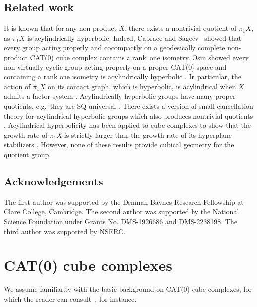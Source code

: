 \documentclass[12pt,oneside]{amsart}
\theoremstyle{definition}
\theoremstyle{definition}
\theoremstyle{remark}
\begin{document}
\subsection*{Related work}
It is known that for any non-product $X$, there exists a nontrivial quotient of $\pi_1 X$, as $\pi_1 X$ is acylindrically hyperbolic. Indeed,
Caprace and Sageev~\cite{CapraceSageev2011} showed that every group acting properly and cocompactly on a geodesically complete non-product CAT(0) cube complex contains a rank~one isometry. Osin showed every non virtually cyclic group acting properly on a proper CAT(0) space and containing a rank one isometry is acylindrically hyperbolic \cite{Osin2016}. 
In particular, the action of $\pi_1 X$ on its contact graph, which is hyperbolic, is acylindrical  when $X$ admits a factor system \cite{BehrstockHagenSisto}. Acylindrically hyperbolic groups have many proper quotients, e.g.\ they are SQ-universal \cite{DahmaniGuirardelOsin2017}. There exists a version of small-cancellation theory for acylindrical hyperbolic groups which also produces nontrivial quotients \cite{Hull2016}.
Acylindrical hyperbolicity has been applied to cube complexes to show that the growth-rate of $\pi_1X$ is strictly larger than the growth-rate of its hyperplane stabilizers \cite{DahmaniFuterWise}.
However, none of these results provide cubical geometry for the quotient group.


\subsection*{Acknowledgements}
The first author was supported by the Denman Baynes Research Fellowship at Clare College, Cambridge.
The second author was supported by the National Science Foundation
under Grants No. DMS-1926686 and DMS-2238198. The third author was supported by NSERC.

\section{CAT(0) cube complexes}\label{sec: cubes}
We  assume familiarity with the basic background on CAT(0) cube complexes, for which the reader can consult~\cite{GGTbook14,  WiseCBMS2012, WiseBook}, for instance.
\end{document}
